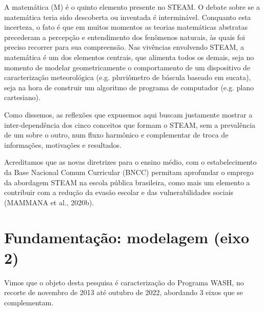 \documentclass[
12pt,		%
openright,	%
twoside,  %
a4paper,			%
chapter=TITLE,		%
english,			%
french,				%
spanish,			%
brazil				%
]{USPSC-classe/USPSC}
\begin{document}
A matem\'atica (M) \'e o quinto elemento presente no STEAM. O debate sobre se a matem\'atica teria sido descoberta ou inventada \'e intermin\'avel. Conquanto esta incerteza, o fato \'e que em muitos momentos as teorias matem\'aticas abstratas precederam a percep\c{c}\~ao e entendimento dos fen\^omenos naturais, \`as quais foi preciso recorrer para sua compreens\~ao. Nas viv\^encias envolvendo STEAM, a matem\'atica \'e um dos elementos centrais, que alimenta todos os demais, seja no momento de modelar geometricamente o comportamento de um dispositivo de caracteriza\c{c}\~ao meteorol\'ogica (e.g. pluvi\^ometro de b\'ascula baseado em sucata), seja na hora de construir um algoritmo de programa de computador (e.g. plano cartesiano).




Como dissemos, as reflex\~oes que expusemos aqui buscam justamente mostrar a inter-depend\^encia dos cinco conceitos que formam o STEAM, sem a preval\^encia de um sobre o outro, num fluxo harm\^onico e complementar de troca de informa\c{c}\~oes, motiva\c{c}\~oes e resultados.





\noindent\begin{center}\mbox{\centering{}}\end{center}


Acreditamos que as novas diretrizes para o ensino m\'edio, com o estabelecimento da Base Nacional Comum Curricular (BNCC) permitam aprofundar o emprego da abordagem STEAM na escola p\'ublica brasileira, como mais um elemento a contribuir com a redu\c{c}\~ao da evas\~ao escolar e das vulnerabilidades sociais  (MAMMANA et al., 2020b).




\section[Fundamenta\c{c}\~ao: modelagem (eixo 2)]{Fundamenta\c{c}\~ao: modelagem (eixo 2)}\label{Fundamenta\c{c}\~ao: modelagem (eixo 2)}
Vimos que o objeto desta pesquisa \'e caracteriza\c{c}\~ao do Programa WASH, no recorte de novembro de 2013 at\'e outubro de 2022, abordando 3 eixos que se complementam.
\end{document}
